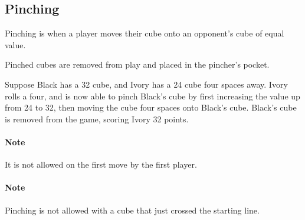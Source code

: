 \subsection{Pinching}\label{sec:pinching}
Pinching is when a player moves their cube onto an opponent's cube of equal value.

Pinched cubes are removed from play and placed in the pincher's pocket.

\example Suppose Black has a 32 cube, and Ivory has a 24 cube four spaces away. 
Ivory rolls a four, and is now able to pinch Black's cube by first increasing the value up from 24 to 32, then moving the cube four spaces onto Black's cube.
Black's cube is removed from the game, scoring Ivory 32 points.

\paragraph{Note} It is not allowed on the first move by the first player.

\paragraph{Note} Pinching is not allowed with a cube that just crossed the starting line.